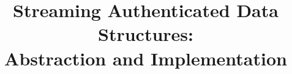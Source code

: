 \documentclass{sig-alternate-2013}
\begin{document}
\title{Streaming Authenticated Data Structures: \\
Abstraction and Implementation}

%
%
%
%
%
\end{document}
